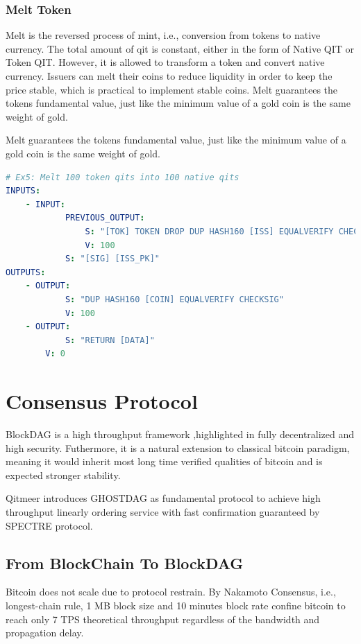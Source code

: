\documentclass[a4paper,11pt]{article}
\begin{document}
\subsubsection{Melt Token}

Melt is the reversed process of mint, i.e., conversion from tokens to native currency. The total amount of qit is constant, either in the form of Native QIT or Token QIT. However, it is allowed to transform a token and convert native currency. Issuers can melt their coins to reduce liquidity in order to keep the price stable, which is practical to implement stable coins. Melt guarantees the tokens fundamental value, just like the minimum value of a gold coin is the same weight of gold.   


Melt guarantees the tokens fundamental value, just like the minimum value of a gold coin is the same weight of gold.

\lstset{basicstyle=\tiny,style=myListStyle}
\begin{lstlisting}[language=yaml, numbers=none,basicstyle=\footnotesize]
# Ex5: Melt 100 token qits into 100 native qits
INPUTS:
	- INPUT:
			PREVIOUS_OUTPUT:
				S: "[TOK] TOKEN DROP DUP HASH160 [ISS] EQUALVERIFY CHECKSIG"
				V: 100
			S: "[SIG] [ISS_PK]"
OUTPUTS:
	- OUTPUT:
			S: "DUP HASH160 [COIN] EQUALVERIFY CHECKSIG"
			V: 100
	- OUTPUT:
			S: "RETURN [DATA]"
		V: 0
\end{lstlisting}


\section{Consensus Protocol}

BlockDAG is a high throughput framework ,highlighted in fully decentralized and high security. Futhermore, it is a natural extension to classical bitcoin paradigm, meaning it would inherit most  long time verified qualities of bitcoin and is expected stronger stability.

Qitmeer introduces GHOSTDAG as fundamental protocol to achieve high throughput linearly ordering service with fast confirmation guaranteed by SPECTRE protocol.

\subsection{From BlockChain To BlockDAG}
Bitcoin does not scale due to protocol restrain. By Nakamoto Consensus, i.e., longest-chain rule, 1 MB block size and 10 minutes block rate confine bitcoin to reach only 7 TPS theoretical throughput regardless of the bandwidth and propagation delay.
\end{document}
